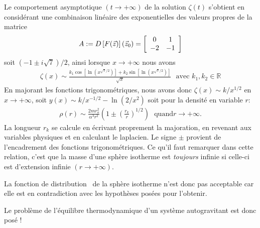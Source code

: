 Le comportement asymptotique $\left(t\rightarrow+\infty\right)$ de la
solution $\zeta(t)$ s'obtient en considérant une combinaison linéaire
des exponentielles des valeurs propres de la matrice
\begin{align*}
	A:=D\left[F(\vec{z})\right](\vec{z}_0)=\left[
\begin{array}
[c]{cc}%
0     & 1\\
-2 & -1\\
\end{array}
\right]
\end{align*}
soit $\left(  -1\pm i\sqrt
{7}\right)  /2$, ainsi lorsque $x\rightarrow+\infty$ nous avons
\begin{align*}
\zeta\left(  x\right)
\sim\frac{k_{1}\cos\left[  \ln\left(  x^{\sqrt{7}/2}\right)  \right]
+k_{2}\sin\left[  \ln\left(  x^{\sqrt{7}/2}\right)  \right]  }{\sqrt{x}%
}\ \ \ \text{avec }k_{1},k_{2}\in\mathbb{R}%
\end{align*}
En majorant les fonctions trigonométriques, nous avons donc $\zeta\left(
x\right)  \sim k/x^{1/2}$ en $x\rightarrow+\infty$, soit $y\left(  x\right)
\sim k/x^{-1/2}-\ln\left(  2/x^{2}\right)  $ soit pour la densité en
variable $r$:
\begin{align}
\rho\left(  r\right)  \sim\frac{2mr_{o}^{2}}{\alpha^{3}r^{2}}\left(
1\pm\left(  \frac{r_{k}}{r}\right)  ^{1/2}\right)  \ \ \ \text{quand
}r\rightarrow+\infty\text{.}\label{asymp_sph_iso}%
\end{align}
La longueur $r_{k}$ se calcule en écrivant proprement la majoration, en
revenant aux variables physiques et en calculant le laplacien. Le signe $\pm$ provient de l'encadrement des fonctions
trigonométriques. Ce qu'il faut remarquer dans cette
relation, c'est que la masse d'une sphère isotherme est \emph{toujours} infinie si
celle-ci est d'extension infinie $\left(  r\rightarrow+\infty\right)$.

La fonction de distribution~ de la sphère isotherme n'est donc pas acceptable car elle est en contradiction avec les hypothèses posées pour l'obtenir.

Le problème de l'équilibre thermodynamique d'un système autogravitant est donc posé !

